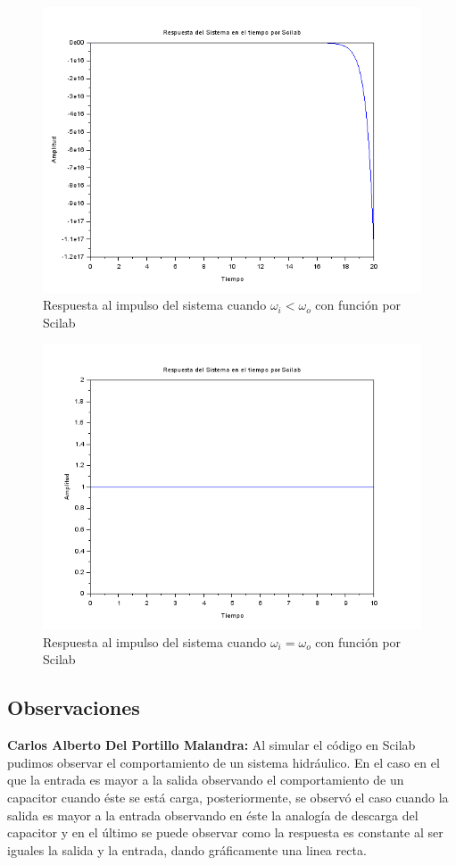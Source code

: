 \documentclass{article}
\begin{document}
	
	\begin{figure}[H]
		\centering
		\includegraphics[scale=0.55]{menor1.PNG}
		\centering
		\caption{Respuesta al impulso del sistema cuando $ \omega_i < \omega_o $ con función por Scilab}
	\end{figure}
	
	\begin{figure}[H]
		\centering
		\includegraphics[scale=0.5]{igual1.PNG}
		\centering
		\caption{Respuesta al impulso del sistema cuando $ \omega_i = \omega_o $ con función por Scilab}
	\end{figure}

\subsection{Observaciones}
\textbf{Carlos Alberto Del Portillo Malandra:} Al simular el código en Scilab pudimos observar el comportamiento de un sistema hidráulico. En el caso en el que la entrada es mayor a la salida observando el comportamiento de un capacitor cuando éste se está carga, posteriormente, se observó el caso cuando la salida es mayor a la entrada observando en éste la analogía de descarga del capacitor y en el último se puede observar como la respuesta es constante al ser iguales la salida y la entrada, dando gráficamente una linea recta.
\end{document}
